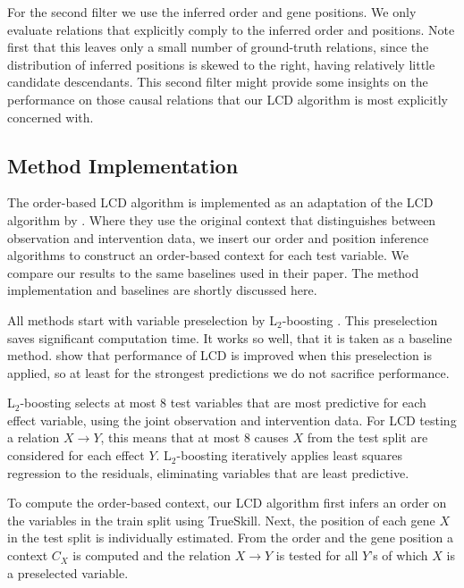 For the second filter we use the inferred order and gene positions. We only evaluate relations that explicitly comply to the inferred order and positions. Note first that this leaves only a small number of ground-truth relations, since the distribution of inferred positions is skewed to the right, having relatively little candidate descendants. This second filter might provide some insights on the performance on those causal relations that our LCD algorithm is most explicitly concerned with.

\subsection{Method Implementation}

The order-based LCD algorithm is implemented as an adaptation of the LCD algorithm by \citet{versteeg2019boosting}. Where they use the original context that distinguishes between observation and intervention data, we insert our order and position inference algorithms to construct an order-based context for each test variable. We compare our results to the same baselines used in their paper. The method implementation and baselines are shortly discussed here. 

All methods start with variable preselection by L$_2$-boosting \citep{schapire1998boosting}. This preselection saves significant computation time. It works so well, that it is taken as a baseline method. \citet{versteeg2019boosting} show that performance of LCD is improved when this preselection is applied, so at least for the strongest predictions we do not sacrifice performance.

L$_2$-boosting selects at most 8 test variables that are most predictive for each effect variable, using the joint observation and intervention data. For LCD testing a relation $X\to Y$, this means that at most 8 causes $X$ from the test split are considered for each effect $Y$. L$_2$-boosting iteratively applies least squares regression to the residuals, eliminating variables that are least predictive. 

To compute the order-based context, our LCD algorithm first infers an order on the variables in the train split using TrueSkill. Next, the position of each gene $X$ in the test split is individually estimated. From the order and the gene position a context $C_X$ is computed and the relation $X\to Y$ is tested for all $Y$'s of which $X$ is a preselected variable. 

